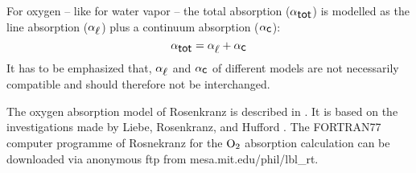 {For oxygen -- like for water vapor -- the total absorption 
($\alpha_{\mbox{\sf tot}}$) is modelled as the line absorption ($\alpha_{\mbox{$\ell$}}$) plus a  
continuum absorption ($\alpha_{\mbox{\sf c}}$):
\begin{equation}
  \label{eq:o2:totabs}
  \alpha_{\mbox{\sf tot}} = \alpha_{\mbox{$\ell$}} + \alpha_{\mbox{\sf c}}
\end{equation}
It has to be emphasized that, $\alpha_{\mbox{$\ell$}}$ and $\alpha_{\mbox{\sf c}}$ of different
models are not necessarily compatible and should therefore not be interchanged.




\label{leveld:O2_pwr98}


\label{levele:pwr93_o2lines}
The oxygen absorption model of Rosenkranz is described in \cite{pwr:93}. It 
is based on the investigations made by Liebe, Rosenkranz, and Hufford 
\cite{liebeetal:92}. The FORTRAN77 computer programme of Rosnekranz for 
the $\mbox{O}_2$ absorption calculation can be downloaded via anonymous ftp from 
mesa.mit.edu/phil/lbl\_rt.

}
